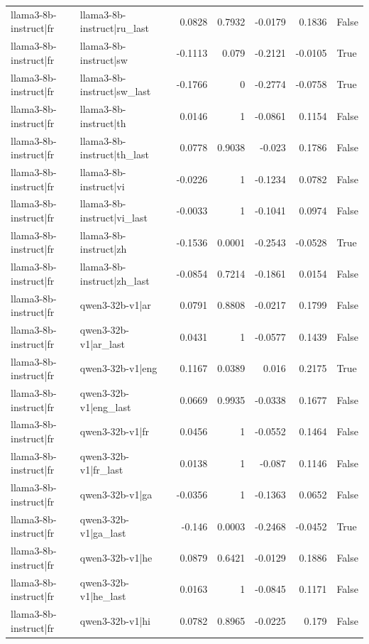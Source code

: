 \begin{table}
\begin{tabular}{l l r r r r l}
llama3-8b-instruct|fr & llama3-8b-instruct|ru_last & 0.0828 & 0.7932 & -0.0179 & 0.1836 & False \\
llama3-8b-instruct|fr & llama3-8b-instruct|sw & -0.1113 & 0.079 & -0.2121 & -0.0105 & True \\
llama3-8b-instruct|fr & llama3-8b-instruct|sw_last & -0.1766 & 0 & -0.2774 & -0.0758 & True \\
llama3-8b-instruct|fr & llama3-8b-instruct|th & 0.0146 & 1 & -0.0861 & 0.1154 & False \\
llama3-8b-instruct|fr & llama3-8b-instruct|th_last & 0.0778 & 0.9038 & -0.023 & 0.1786 & False \\
llama3-8b-instruct|fr & llama3-8b-instruct|vi & -0.0226 & 1 & -0.1234 & 0.0782 & False \\
llama3-8b-instruct|fr & llama3-8b-instruct|vi_last & -0.0033 & 1 & -0.1041 & 0.0974 & False \\
llama3-8b-instruct|fr & llama3-8b-instruct|zh & -0.1536 & 0.0001 & -0.2543 & -0.0528 & True \\
llama3-8b-instruct|fr & llama3-8b-instruct|zh_last & -0.0854 & 0.7214 & -0.1861 & 0.0154 & False \\
llama3-8b-instruct|fr & qwen3-32b-v1|ar & 0.0791 & 0.8808 & -0.0217 & 0.1799 & False \\
llama3-8b-instruct|fr & qwen3-32b-v1|ar_last & 0.0431 & 1 & -0.0577 & 0.1439 & False \\
llama3-8b-instruct|fr & qwen3-32b-v1|eng & 0.1167 & 0.0389 & 0.016 & 0.2175 & True \\
llama3-8b-instruct|fr & qwen3-32b-v1|eng_last & 0.0669 & 0.9935 & -0.0338 & 0.1677 & False \\
llama3-8b-instruct|fr & qwen3-32b-v1|fr & 0.0456 & 1 & -0.0552 & 0.1464 & False \\
llama3-8b-instruct|fr & qwen3-32b-v1|fr_last & 0.0138 & 1 & -0.087 & 0.1146 & False \\
llama3-8b-instruct|fr & qwen3-32b-v1|ga & -0.0356 & 1 & -0.1363 & 0.0652 & False \\
llama3-8b-instruct|fr & qwen3-32b-v1|ga_last & -0.146 & 0.0003 & -0.2468 & -0.0452 & True \\
llama3-8b-instruct|fr & qwen3-32b-v1|he & 0.0879 & 0.6421 & -0.0129 & 0.1886 & False \\
llama3-8b-instruct|fr & qwen3-32b-v1|he_last & 0.0163 & 1 & -0.0845 & 0.1171 & False \\
llama3-8b-instruct|fr & qwen3-32b-v1|hi & 0.0782 & 0.8965 & -0.0225 & 0.179 & False \\

\end{tabular}
\end{table}
